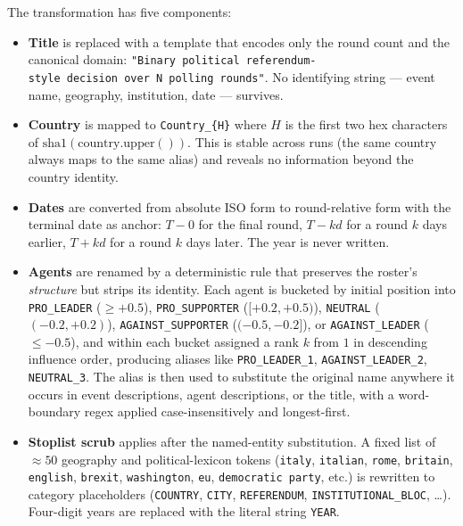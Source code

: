 \documentclass[
]{article}
\providecommand{\tightlist}{%
  \setlength{\itemsep}{0pt}\setlength{\parskip}{0pt}}
\begin{document}
The transformation has five components:

\begin{itemize}
\tightlist
\item
  \textbf{Title} is replaced with a template that encodes only the round
  count and the canonical domain:
  \texttt{"Binary\ political\ referendum-style\ decision\ over\ N\ polling\ rounds"}.
  No identifying string --- event name, geography, institution, date ---
  survives.
\item
  \textbf{Country} is mapped to \texttt{Country\_\{H\}} where \(H\) is
  the first two hex characters of
  \(\text{sha1}(\text{country}.\text{upper}())\). This is stable across
  runs (the same country always maps to the same alias) and reveals no
  information beyond the country identity.
\item
  \textbf{Dates} are converted from absolute ISO form to round-relative
  form with the terminal date as anchor: \(T - 0\) for the final round,
  \(T - k d\) for a round \(k\) days earlier, \(T + k d\) for a round
  \(k\) days later. The year is never written.
\item
  \textbf{Agents} are renamed by a deterministic rule that preserves the
  roster's \emph{structure} but strips its identity. Each agent is
  bucketed by initial position into \texttt{PRO\_LEADER}
  (\(\geq +0.5\)), \texttt{PRO\_SUPPORTER} (\([+0.2, +0.5)\)),
  \texttt{NEUTRAL} (\((-0.2, +0.2)\)), \texttt{AGAINST\_SUPPORTER}
  (\((-0.5, -0.2]\)), or \texttt{AGAINST\_LEADER} (\(\leq -0.5\)), and
  within each bucket assigned a rank \(k\) from \(1\) in descending
  influence order, producing aliases like \texttt{PRO\_LEADER\_1},
  \texttt{AGAINST\_LEADER\_2}, \texttt{NEUTRAL\_3}. The alias is then
  used to substitute the original name anywhere it occurs in event
  descriptions, agent descriptions, or the title, with a word-boundary
  regex applied case-insensitively and longest-first.
\item
  \textbf{Stoplist scrub} applies after the named-entity substitution. A
  fixed list of \(\approx 50\) geography and political-lexicon tokens
  (\texttt{italy}, \texttt{italian}, \texttt{rome}, \texttt{britain},
  \texttt{english}, \texttt{brexit}, \texttt{washington}, \texttt{eu},
  \texttt{democratic\ party}, etc.) is rewritten to category
  placeholders (\texttt{COUNTRY}, \texttt{CITY}, \texttt{REFERENDUM},
  \texttt{INSTITUTIONAL\_BLOC}, \ldots). Four-digit years are replaced
  with the literal string \texttt{YEAR}.
\end{itemize}
\end{document}
